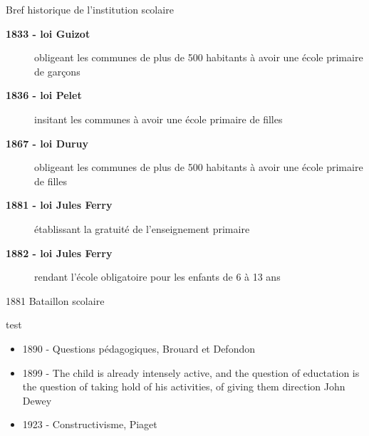\begin{frame}{Bref historique de l'institution scolaire}
\begin{description}
\item[\bf 1833 - loi Guizot] obligeant les communes de plus de 500 habitants à avoir une école primaire de garçons
\item[\bf 1836 - loi Pelet] insitant les communes à avoir une école primaire de filles
\item[\bf 1867 - loi Duruy] obligeant les communes de plus de 500 habitants à avoir une école primaire de filles
\item[\bf 1881 - loi Jules Ferry] établissant la gratuité de l'enseignement primaire
\item[\bf 1882 - loi Jules Ferry] rendant l'école obligatoire pour les enfants de 6 à 13 ans
\end{description}

\end{frame}

\begin{frame}{1881 Bataillon scolaire}
\end{frame}

\begin{frame}{test}
  \begin{itemize}
  \item 1890 - Questions pédagogiques, Brouard et Defondon
  \item 1899 - \og{}The child is already intensely active, and the question 
  of eductation is the question of taking hold of his activities, of 
  giving them direction\fg{} John Dewey
  \item 1923 - Constructivisme, Piaget
  \end{itemize}
  
\end{frame}


